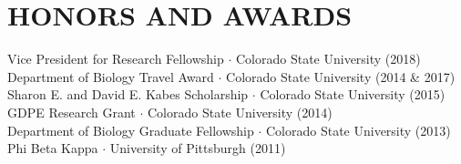\documentclass{cv}
\begin{document}





\section*{HONORS AND AWARDS}



Vice President for Research Fellowship $\cdot$ Colorado State University (2018) \\ %
Department of Biology Travel Award $\cdot$ Colorado State University (2014 \& 2017) \\ %
Sharon E. and David E. Kabes Scholarship $\cdot$ Colorado State University (2015) \\ %
GDPE Research Grant $\cdot$ Colorado State University (2014) \\ %
Department of Biology Graduate Fellowship $\cdot$ Colorado State University (2013) \\ %
Phi Beta Kappa $\cdot$ University of Pittsburgh (2011)

\end{document}
